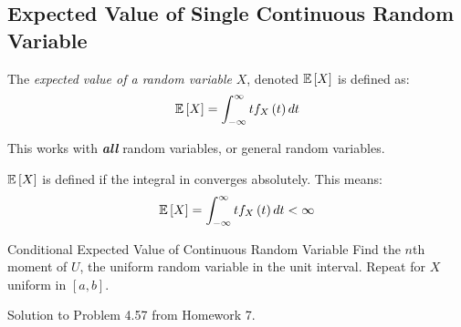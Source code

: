 	\subsection{Expected Value of Single Continuous Random Variable} \label{subsec:Expected Value of Single Continuous}
		\begin{definition} \label{def:Expected Value of Single Continuous}
			The \emph{expected value of a random variable} $X$, denoted $\operatorname{\operatorname{\mathbb{E}}} \left[ X \right]$ is defined as:
			\begin{equation} \label{eq:Expected Value of Single Continuous}
				\operatorname{\operatorname{\mathbb{E}}} \left[ X \right] = \int_{-\infty}^{\infty} t f_{X} \left( t \right) dt
			\end{equation}
			\begin{remark}
				This works with \emph{\textbf{all}} random variables, or general random variables.
			\end{remark}
			\begin{remark}
				$\operatorname{\operatorname{\mathbb{E}}} \left[ X \right]$ is defined if the integral in  converges absolutely.
				This means:
				\begin{equation*}
					\operatorname{\operatorname{\mathbb{E}}} \left[ X \right] = \int_{-\infty}^{\infty} t f_{X} \left( t \right) dt < \infty
				\end{equation*}
			\end{remark}
		\end{definition}
		\begin{example}[Problem 4.57]{Conditional Expected Value of Continuous Random Variable}
			Find the $n$th moment of $U$, the uniform random variable in the unit interval.
			Repeat for $X$ uniform in $\left[ a,b \right]$.

			\tcblower

			Solution to Problem 4.57 from Homework 7.
		\end{example}

